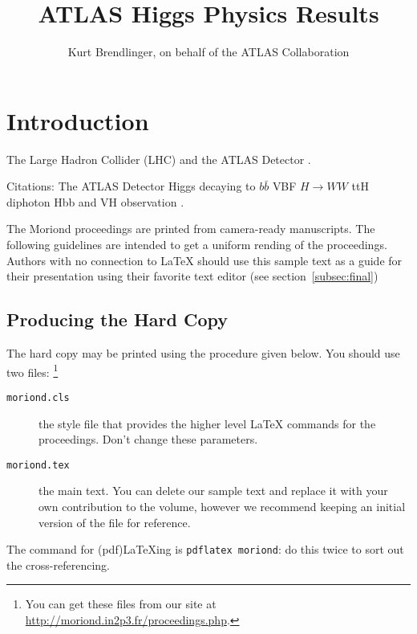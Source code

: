 \documentclass{moriond}
\begin{document}
\linenumbers

\vspace*{4cm}
\title{ATLAS Higgs Physics Results}

\author{ Kurt Brendlinger, on behalf of the ATLAS Collaboration }

\address{~\\DESY, Notkestra\ss e 85,\\ 22607 Hamburg, Germany}

\maketitle{}

\section{Introduction}

The Large Hadron Collider (LHC) \cite{Evans:2008zzb} and the ATLAS Detector \cite{PERF-2007-01}.

Citations:
The ATLAS Detector \cite{PERF-2007-01}
Higgs decaying to $b\bar b$ \cite{HIGG-2018-50}
VBF $H{\rightarrow}WW$ \cite{HIGG-2017-14}
ttH diphoton \cite{ATLAS-CONF-2019-004}
Hbb and VH observation \cite{HIGG-2018-04}.

The Moriond proceedings are printed from camera-ready manuscripts.
The following guidelines are intended to get a uniform rending of the 
proceedings. Authors with no connection to \LaTeX{} should use this
sample text as a guide for their presentation using their favorite
text editor (see section~\ref{subsec:final})

\subsection{Producing the Hard Copy}\label{subsec:prod}

The hard copy may be printed using the procedure given below.
You should use
two files: \footnote{You can get these files from
our site at \url{http://moriond.in2p3.fr/proceedings.php}.}
\begin{description}
\item[\texttt{moriond.cls}] the style file that provides the higher
level \LaTeX{} commands for the proceedings. Don't change these parameters.
\item[\texttt{moriond.tex}] the main text. You can delete our sample
text and replace it with your own contribution to the volume, however we
recommend keeping an initial version of the file for reference.
\end{description}
The command for (pdf)\LaTeX ing is \texttt{pdflatex moriond}: do this twice to
sort out the cross-referencing.
\end{document}

